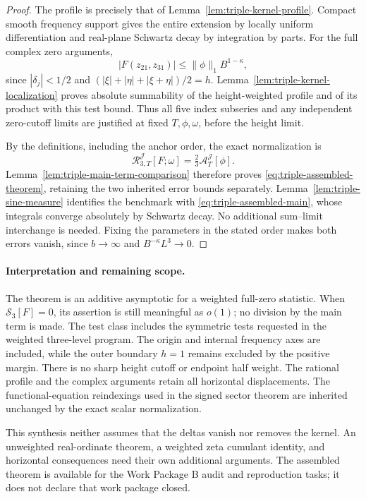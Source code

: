 \documentclass[11pt]{article}
\begin{document}
\begin{proof}
The profile is precisely that of Lemma~\ref{lem:triple-kernel-profile}.
Compact smooth frequency support gives the entire extension by locally
uniform differentiation and real-plane Schwartz decay by integration
by parts. For the full complex zero arguments,
\[
 |F(z_{21},z_{31})|\leq\|\phi\|_1B^{1-\kappa},
\]
since \(|\delta_j|<1/2\) and
\((|\xi|+|\eta|+|\xi+\eta|)/2=h\).
Lemma~\ref{lem:triple-kernel-localization} proves absolute summability
of the height-weighted profile and of its product with this test bound.
Thus all five index subseries and any independent zero-cutoff limits
are justified at fixed \(T,\phi,\omega\), before the height limit.

By the definitions, including the anchor order, the exact normalization is
\[
 \mathcal R^{\mathcal J}_{3,T}[F;\omega]
       =\tfrac23\mathcal A_T^{\mathcal J}[\phi].
\]
Lemma~\ref{lem:triple-main-term-comparison} therefore proves
\eqref{eq:triple-assembled-theorem}, retaining the two inherited error
bounds separately. Lemma~\ref{lem:triple-sine-measure} identifies the
benchmark with \eqref{eq:triple-assembled-main}, whose integrals converge
absolutely by Schwartz decay. No additional sum--limit interchange is
needed. Fixing the parameters in the stated order makes both errors
vanish, since \(b\to\infty\) and \(B^{-\kappa}L^3\to0\).
\end{proof}

\paragraph{Interpretation and remaining scope.}
The theorem is an additive asymptotic for a weighted full-zero statistic.
When \(\mathcal S_3[F]=0\), its assertion is still meaningful as \(o(1)\);
no division by the main term is made. The test class includes the
symmetric tests requested in the weighted three-level program.
The origin and internal frequency axes are included, while the outer
boundary \(h=1\) remains excluded by the positive margin.
There is no sharp height cutoff or endpoint half weight.
The rational profile and the complex arguments retain all horizontal
displacements. The functional-equation reindexings used in the signed
sector theorem are inherited unchanged by the exact scalar normalization.

This synthesis neither assumes that the deltas vanish nor removes the
kernel. An unweighted real-ordinate theorem, a weighted zeta cumulant
identity, and horizontal consequences need their own additional arguments.
The assembled theorem is available for the Work Package B audit and
reproduction tasks; it does not declare that work package closed.
\end{document}
